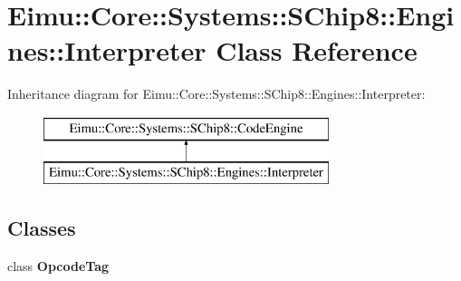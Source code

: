 \hypertarget{class_eimu_1_1_core_1_1_systems_1_1_s_chip8_1_1_engines_1_1_interpreter}{
\section{Eimu::Core::Systems::SChip8::Engines::Interpreter Class Reference}
\label{class_eimu_1_1_core_1_1_systems_1_1_s_chip8_1_1_engines_1_1_interpreter}
}
Inheritance diagram for Eimu::Core::Systems::SChip8::Engines::Interpreter:\begin{figure}[H]
\begin{center}
\leavevmode
\includegraphics[height=2.000000cm]{class_eimu_1_1_core_1_1_systems_1_1_s_chip8_1_1_engines_1_1_interpreter}
\end{center}
\end{figure}
\subsection*{Classes}
\begin{DoxyCompactItemize}
\item 
class {\bfseries OpcodeTag}
\end{DoxyCompactItemize}
